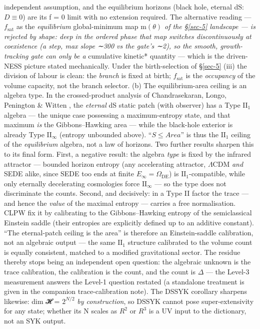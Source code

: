 \documentclass[aps,prd,preprint,nofootinbib,superscriptaddress]{revtex4-2}
\begin{document}
independent assumption, and the equilibrium horizons (black hole,
eternal dS: \(D \equiv  0\)) are its f = 0 limit with no extension
required. The alternative reading --- \(f_{\mathrm{sat}}\) as the
\emph{equilibrium} global-minimum map m\emph{\((\theta )\) of the
§\ref{sec-5} landscape --- is rejected by shape: deep in the ordered
phase that map switches discontinuously at coexistence (a step, max
slope ∼300 vs the gate's ∼2), so the smooth, growth-tracking gate can
only be a }cumulative kinetic* quantity --- which is the driven-NESS
picture stated mechanically. Under the birth-selection of §\ref{sec-5}
(iii) the division of labour is clean: the \emph{branch} is fixed at
birth; \(f_{\mathrm{sat}}\) is the \emph{occupancy} of the volume
capacity, not the branch selector. (b) The equilibrium-area ceiling is
an algebra type. In the crossed-product analysis of Chandrasekaran,
Longo, Penington \& Witten \cite{Chandrasekaran:2022cip}, the
\emph{eternal} dS static patch (with observer) has a Type
\(\mathrm{II}_{1}\) algebra --- the unique case possessing a
maximum-entropy state, and that maximum \emph{is} the Gibbons--Hawking
area --- while the black-hole exterior is already Type
\(\mathrm{II}_\infty\) (entropy unbounded above). ``\(S \leq  Area\)''
is thus the \(\mathrm{II}_{1}\) ceiling of the \emph{equilibrium}
algebra, not a law of horizons. Two further results sharpen this to its
final form. First, a negative result: the algebra \emph{type} is fixed
by the infrared attractor --- bounded horizon entropy (any accelerating
attractor, \(\Lambda \mathrm{CDM}\) \emph{and} SEDE alike, since SEDE
too ends at finite \(E_\infty  = \Omega _\mathrm{DE}\)) is
\(\mathrm{II}_{1}\)-compatible, while only eternally decelerating
cosmologies force \(\mathrm{II}_\infty\) --- so the type does not
discriminate the counts. Second, and decisively: in a Type II factor the
trace --- and hence the \emph{value} of the maximal entropy --- carries
a free normalisation. CLPW fix it by calibrating to the Gibbons--Hawking
entropy of the semiclassical Einstein saddle (their entropies are
explicitly defined up to an additive constant). ``The eternal-patch
ceiling is the area'' is therefore an Einstein-saddle calibration, not
an algebraic output --- the same \(\mathrm{II}_{1}\) structure
calibrated to the volume count is equally consistent, matched to a
modified gravitational sector. The residue thereby stops being an
independent open question: the algebraic unknown is the trace
calibration, the calibration is the count, and the count is \(\Delta\)
--- the Level-3 measurement answers the Level-1 question restated (a
standalone treatment is given in the companion trace-calibration note).
The DSSYK corollary sharpens likewise: dim 𝓗 = \(2^{N/2}\) \emph{by
construction}, so DSSYK cannot pose super-extensivity for any state;
whether its N scales as \(R^{2}\) or \(R^{3}\) is a UV input to the
dictionary, not an SYK output.
\end{document}
